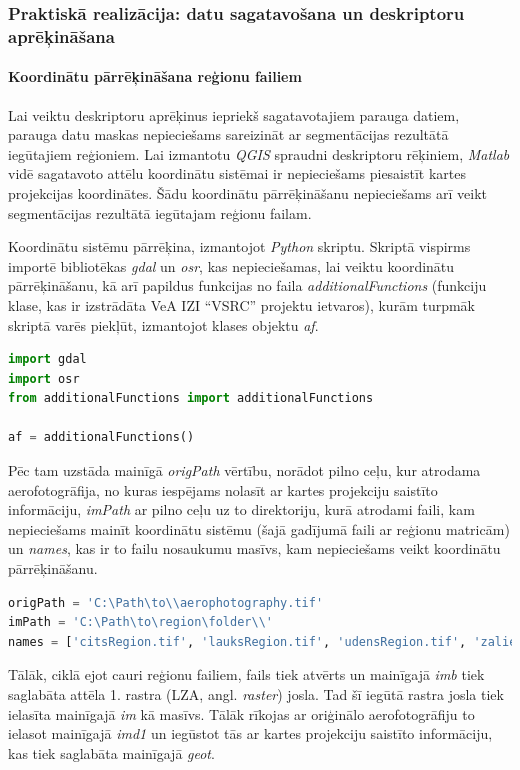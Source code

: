 \documentclass[12pt,paper=a4]{report}
\begin{document}
\subsubsection{Praktiskā realizācija: datu sagatavošana un deskriptoru aprēķināšana}
\paragraph{Koordinātu pārrēķināšana reģionu failiem}
Lai veiktu deskriptoru aprēķinus iepriekš sagatavotajiem parauga datiem, parauga datu maskas nepieciešams sareizināt ar segmentācijas rezultātā iegūtajiem reģioniem. Lai izmantotu \textit{QGIS} spraudni deskriptoru rēķiniem, \textit{Matlab} vidē sagatavoto attēlu koordinātu sistēmai ir nepieciešams piesaistīt kartes projekcijas koordinātes. Šādu koordinātu pārrēķināšanu nepieciešams arī veikt segmentācijas rezultātā iegūtajam reģionu failam.\par 
Koordinātu sistēmu pārrēķina, izmantojot \textit{Python} skriptu. Skriptā vispirms importē bibliotēkas \textit{gdal} un \textit{osr}, kas nepieciešamas, lai veiktu koordinātu pārrēķināšanu, kā arī papildus funkcijas no faila \textit{additionalFunctions} (funkciju klase, kas ir izstrādāta VeA IZI “VSRC” projektu ietvaros), kurām turpmāk skriptā varēs piekļūt, izmantojot klases objektu \textit{af}. 
\begin{lstlisting}[language=Python]
import gdal
import osr
from additionalFunctions import additionalFunctions

af = additionalFunctions()
\end{lstlisting}\par
Pēc tam uzstāda mainīgā \textit{origPath} vērtību, norādot pilno ceļu, kur atrodama aerofotogrāfija, no kuras iespējams nolasīt ar kartes projekciju saistīto informāciju, \textit{imPath} ar pilno ceļu uz to direktoriju, kurā atrodami faili, kam nepieciešams mainīt koordinātu sistēmu (šajā gadījumā faili ar reģionu matricām) un \textit{names}, kas ir to failu nosaukumu masīvs, kam nepieciešams veikt koordinātu pārrēķināšanu.
\begin{lstlisting}[language=Python]
origPath = 'C:\Path\to\\aerophotography.tif'
imPath = 'C:\Path\to\region\folder\\'
names = ['citsRegion.tif', 'lauksRegion.tif', 'udensRegion.tif', 'zaliensRegion.tif', 'kokiRegion.tif', 'region.tif']
\end{lstlisting}\par
Tālāk, ciklā ejot cauri reģionu failiem, fails tiek atvērts un mainīgajā \textit{imb} tiek saglabāta attēla 1. rastra (LZA, angl. \textit{raster}) josla. Tad šī iegūtā rastra josla tiek ielasīta mainīgajā \textit{im} kā masīvs. Tālāk rīkojas ar oriģinālo aerofotogrāfiju to ielasot mainīgajā \textit{imd1} un iegūstot tās ar kartes projekciju saistīto informāciju, kas tiek saglabāta mainīgajā \textit{geot}.
\end{document}
